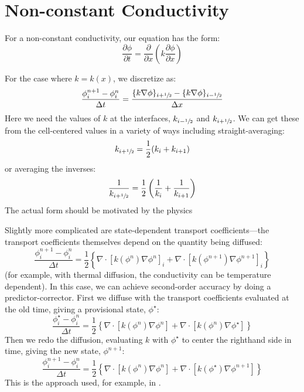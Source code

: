 \section{Non-constant Conductivity}

For a non-constant conductivity, our equation has the form:
\begin{equation}
\frac{\partial \phi}{\partial t} = \frac{\partial}{\partial x} \left (k \frac{\partial \phi}{\partial x} \right )
\end{equation}

For the case where $k = k(x)$,
  we discretize as:
  \begin{equation}
  \frac{\phi_i^{n+1} - \phi_i^n}{\Delta t} = 
        \frac{ \{ k \nabla \phi \}_{i+{\sfrac{1}{2}}} -
               \{ k \nabla \phi \}_{i-{\sfrac{1}{2}}}}{\Delta x}
  \end{equation}
 Here we need the values of $k$ at the interfaces, $k_{i-{\sfrac{1}{2}}}$ and
 $k_{i+{\sfrac{1}{2}}}$.  We can get these from the cell-centered values in a
 variety of ways including straight-averaging:
 \begin{equation}
 k_{i+{\sfrac{1}{2}}} = \frac{1}{2} (k_i + k_{i+1})
 \end{equation}
 or averaging the inverses:
 \begin{equation}
 \frac{1}{k_{i+{\sfrac{1}{2}}}} = \frac{1}{2} \left (\frac{1}{k_i} + \frac{1}{k_{i+1}} \right )
 \end{equation}
The actual form should be motivated by the physics
 
Slightly more complicated are state-dependent transport
coefficients---the transport coefficients themselves depend on the
quantity being diffused:
  \begin{equation}
  \frac{\phi_i^{n+1} - \phi_i^n}{\Delta t} = 
        \frac{1}{2} \left \{
               \nabla \cdot [ k(\phi^n) \nabla \phi^n ]_i +
               \nabla \cdot [ k(\phi^{n+1}) \nabla \phi^{n+1} ]_i 
               \right \}
  \end{equation}
  (for example, with thermal diffusion, the conductivity can
  be temperature dependent).  In this case, we can achieve second-order
  accuracy by doing a predictor-corrector.  First we diffuse with
  the transport coefficients evaluated at the old time, giving a provisional
  state, $\phi^\star$:
  \begin{equation}
  \frac{\phi_i^\star - \phi_i^n}{\Delta t} = 
        \frac{1}{2} \left \{
               \nabla \cdot [ k(\phi^n) \nabla \phi^n ] +
               \nabla \cdot [ k(\phi^n) \nabla \phi^\star ] 
               \right \}
  \end{equation}
  Then we redo the diffusion, evaluating $k$ with $\phi^\star$ to
  center the righthand side in time, giving the new state, $\phi^{n+1}$:
  \begin{equation}
  \frac{\phi_i^{n+1} - \phi_i^n}{\Delta t} = 
        \frac{1}{2} \left \{
               \nabla \cdot [ k(\phi^n) \nabla \phi^n ] +
               \nabla \cdot [ k(\phi^\star) \nabla \phi^{n+1} ] 
               \right \}
  \end{equation}
  This is the approach used, for example, in \cite{SNpaper}.


